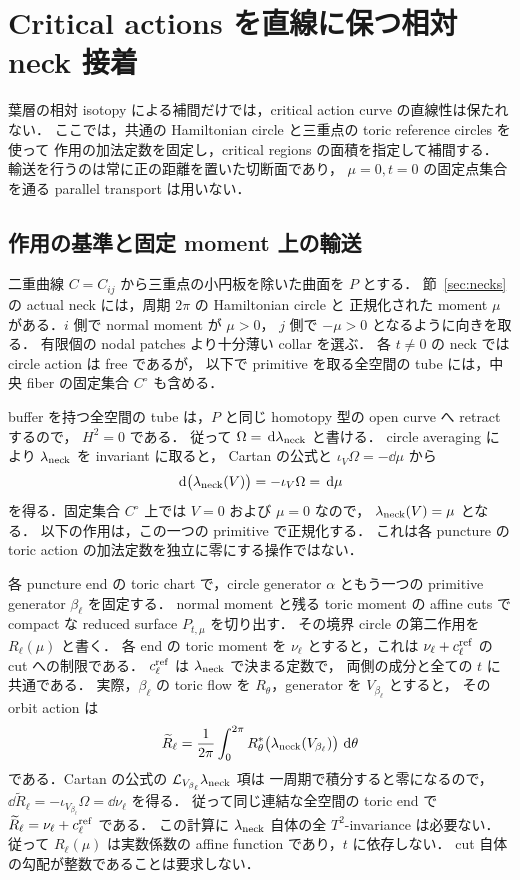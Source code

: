\section{Critical actions を直線に保つ相対 neck 接着}
\label{ng8:section}

葉層の相対 isotopy による補間だけでは，critical action curve の直線性は保たれない．
ここでは，共通の Hamiltonian circle と三重点の toric reference circles を使って
作用の加法定数を固定し，critical regions の面積を指定して補間する．
輸送を行うのは常に正の距離を置いた切断面であり，
$\mu=0,t=0$ の固定点集合を通る parallel transport は用いない．

\subsection{作用の基準と固定 moment 上の輸送}

二重曲線 $C=C_{ij}$ から三重点の小円板を除いた曲面を $P$ とする．
節~\ref{sec:necks} の actual neck には，周期 $2\pi$ の Hamiltonian circle と
正規化された moment $\mu$ がある．$i$ 側で normal moment が $\mu>0$，
$j$ 側で $-\mu>0$ となるように向きを取る．
有限個の nodal patches より十分薄い collar を選ぶ．
各 $t\ne0$ の neck では circle action は free であるが，
以下で primitive を取る全空間の tube には，中央 fiber の固定集合 $C^\circ$ も含める．

buffer を持つ全空間の tube は，$P$ と同じ homotopy 型の open curve へ retract するので，
$H^2=0$ である．
従って $\Omega=\,\mathrm d\lambda_{\rm neck}$ と書ける．
circle averaging により $\lambda_{\rm neck}$ を invariant に取ると，
Cartan の公式と $\iota_V\Omega=-\dd\mu$ から
\[
 \,\mathrm d\bigl(\lambda_{\rm neck}(V)\bigr)
 =-\iota_V\Omega=\,\mathrm d\mu
\]
を得る．固定集合 $C^\circ$ 上では $V=0$ および $\mu=0$ なので，
$\lambda_{\rm neck}(V)=\mu$ となる．
以下の作用は，この一つの primitive で正規化する．
これは各 puncture の toric action の加法定数を独立に零にする操作ではない．

各 puncture end の toric chart で，circle generator $\alpha$ ともう一つの
primitive generator $\beta_\ell$ を固定する．
normal moment と残る toric moment の affine cuts で
compact な reduced surface $P_{t,\mu}$ を切り出す．
その境界 circle の第二作用を $R_\ell(\mu)$ と書く．
各 end の toric moment を $\nu_\ell$ とすると，これは
$\nu_\ell+c_\ell^{\rm ref}$ の cut への制限である．
$c_\ell^{\rm ref}$ は $\lambda_{\rm neck}$ で決まる定数で，
両側の成分と全ての $t$ に共通である．
実際，$\beta_\ell$ の toric flow を $R_\theta$，generator を $V_{\beta_\ell}$ とすると，
その orbit action は
\[
 \widetilde R_\ell=
 \frac1{2\pi}\int_0^{2\pi}R_\theta^*
       \bigl(\lambda_{\rm neck}(V_{\beta_\ell})\bigr)\,\,\mathrm d\theta
\]
である．Cartan の公式の $\mathcal L_{V_{\beta_\ell}}\lambda_{\rm neck}$ 項は
一周期で積分すると零になるので，
$\dd\widetilde R_\ell=-\iota_{V_{\beta_\ell}}\Omega=\dd\nu_\ell$ を得る．
従って同じ連結な全空間の toric end で
$\widetilde R_\ell=\nu_\ell+c_\ell^{\rm ref}$ である．
この計算に $\lambda_{\rm neck}$ 自体の全 $T^2$-invariance は必要ない．
従って $R_\ell(\mu)$ は実数係数の affine function であり，$t$ に依存しない．
cut 自体の勾配が整数であることは要求しない．

